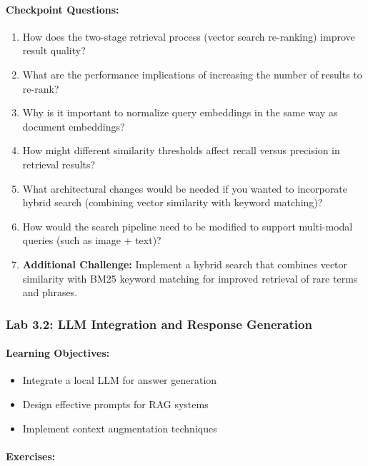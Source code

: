 \documentclass[
  screen,review,acmlarge]{acmart}
\providecommand{\tightlist}{%
  \setlength{\itemsep}{0pt}\setlength{\parskip}{0pt}}
\begin{document}
\paragraph{Checkpoint Questions:}\label{checkpoint-questions-4}

\begin{enumerate}
\def\labelenumi{\arabic{enumi}.}
\tightlist
\item
  How does the two-stage retrieval process (vector search re-ranking) improve result quality?
\item
  What are the performance implications of increasing the number of results to re-rank?
\item
  Why is it important to normalize query embeddings in the same way as document embeddings?
\item
  How might different similarity thresholds affect recall versus precision in retrieval results?
\item
  What architectural changes would be needed if you wanted to incorporate hybrid search (combining vector similarity with keyword matching)?
\item
  How would the search pipeline need to be modified to support multi-modal queries (such as image + text)?
\item
  \textbf{Additional Challenge:} Implement a hybrid search that combines vector similarity with BM25 keyword matching for improved retrieval of rare terms and phrases.
\end{enumerate}

\subsubsection{Lab 3.2: LLM Integration and Response Generation}\label{lab-3.2-llm-integration-and-response-generation}

\paragraph{Learning Objectives:}\label{learning-objectives-5}

\begin{itemize}
\tightlist
\item
  Integrate a local LLM for answer generation
\item
  Design effective prompts for RAG systems
\item
  Implement context augmentation techniques
\end{itemize}

\paragraph{Exercises:}\label{exercises-4}
\end{document}
